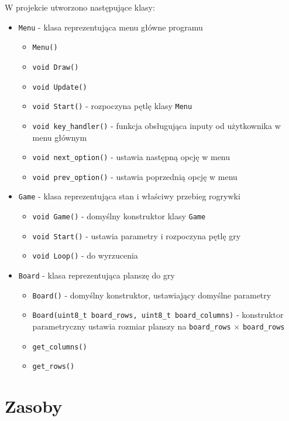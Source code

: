 \documentclass{article}
\begin{document}
W projekcie utworzono następujące klasy:
\begin{itemize}
    \item \texttt{Menu} - klasa reprezentująca menu główne programu
        \begin{itemize}
            \item \texttt{Menu()}
            \item \texttt{void Draw()}
            \item \texttt{void Update()}
            \item \texttt{void Start()} - rozpoczyna pętlę klasy \texttt{Menu}
            \item \texttt{void key\_handler()} - funkcja obsługująca inputy od użytkownika w menu głównym
            \item \texttt{void next\_option()} - ustawia następną opcję w menu
            \item \texttt{void prev\_option()} - ustawia poprzednią opcję w menu
        \end{itemize}

    \item \texttt{Game} - klasa reprezentująca stan i właściwy przebieg rogrywki
        \begin{itemize}
            \item \texttt{void Game()} - domyślny konstruktor klasy \texttt{Game}
            \item \texttt{void Start()} - ustawia parametry i rozpoczyna pętlę gry
            \item \texttt{void Loop()} - do wyrzucenia
        \end{itemize}

    \item \texttt{Board} - klasa reprezentująca planszę do gry
        \begin{itemize}
            \item \texttt{Board()} - domyślny konstruktor, ustawiający domyślne parametry
            \item \texttt{Board(uint8\_t board\_rows, uint8\_t board\_columns)} - konstruktor parametryczny ustawia rozmiar planszy na \texttt{board\_rows} $\times$ \texttt{board\_rows}
            \item \texttt{get\_columns()}
            \item \texttt{get\_rows()}
        \end{itemize}
\end{itemize}
     
\section{Zasoby}
\end{document}
